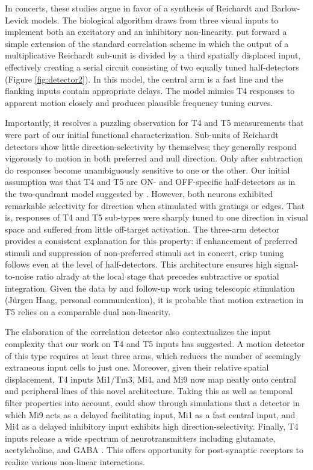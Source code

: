 In concerts, these studies argue in favor of a synthesis of Reichardt and Barlow-Levick models. The biological algorithm draws from three visual inputs to implement both an excitatory and an inhibitory non-linearity. \citet{Haag:2016cq} put forward a simple extension of the standard correlation scheme in which the output of a multiplicative Reichardt sub-unit is divided by a third spatially displaced input, effectively creating a serial circuit consisting of two equally tuned half-detectors (Figure \ref{fig:detector2}). In this model, the central arm is a fast line and the flanking inputs contain appropriate delays. The model mimics T4 responses to apparent motion closely and produces plausible frequency tuning curves.

Importantly, it resolves a puzzling observation for T4 and T5 measurements that were part of our initial functional characterization. Sub-units of Reichardt detectors show little direction-selectivity by themselves; they generally respond vigorously to motion in both preferred and null direction. Only after subtraction do responses become unambiguously sensitive to one or the other. Our initial assumption was that T4 and T5 are ON- and OFF-specific half-detectors as in the two-quadrant model suggested by \citet{Eichner:2011ic}. However, both neurons exhibited remarkable selectivity for direction when stimulated with gratings or edges. That is, responses of T4 and T5 sub-types were sharply tuned to one direction in visual space and suffered from little off-target activation. The three-arm detector provides a consistent explanation for this property: if enhancement of preferred stimuli and suppression of non-preferred stimuli act in concert, crisp tuning follows even at the level of half-detectors. This architecture ensures high signal-to-noise ratio alrady at the local stage that precedes subtractive or spatial integration. Given the data by \citet{Leong:2016hu} and follow-up work using telescopic stimulation (Jürgen Haag, personal communication), it is probable that motion extraction in T5 relies on a comparable dual non-linearity.

The elaboration of the correlation detector also contextualizes the input complexity that our work on T4 and T5 inputs has suggested. A motion detector of this type requires at least three arms, which reduces the number of seemingly extraneous input cells to just one. Moreover, given their relative spatial displacement, T4 inputs Mi1/Tm3, Mi4, and Mi9 now map neatly onto central and peripheral lines of this novel architecture. Taking this as well as temporal filter properties into account, \citet{Arenz:2017aa} could show through simulations that a detector in which Mi9 acts as a delayed facilitating input, Mi1 as a fast central input, and Mi4 as a delayed inhibitory input exhibits high direction-selectivity. Finally, T4 inputs release a wide spectrum of neurotransmitters including glutamate, acetylcholine, and GABA \citep{Pankova:2017aa,Takemura:2017aa}. This offers opportunity for post-synaptic receptors to realize various non-linear interactions.


